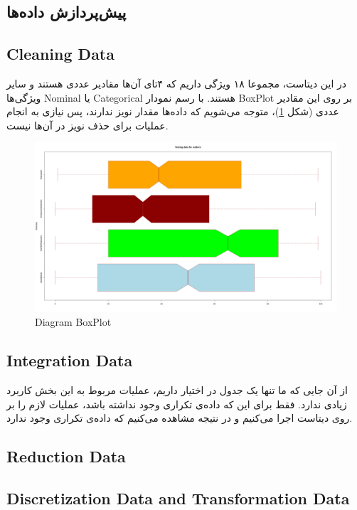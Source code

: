 \documentclass{article}
\begin{document}
\begin{large}
        \newpage
        \section{پیش‌پردازش داده‌ها}
        \subsection{Cleaning Data}
        
        در این دیتاست، مجموعا ۱۸ ویژگی داریم که ۴تای آن‌ها مقادیر عددی هستند و سایر ویژگی‌ها Nominal یا Categorical هستند.
        با رسم نمودار BoxPlot بر روی این مقادیر عددی (شکل \ref{fig:boxplot})، متوجه می‌شویم که داده‌ها مقدار نویز ندارند، پس نیازی به انجام عملیات برای حذف نویز در آن‌ها نیست.

        \begin{figure}[h]
            \centering
            \includegraphics[width=1\textwidth]{images/boxplot.png}
            \caption{Diagram BoxPlot}
            \label{fig:boxplot}
        \end{figure}

        \subsection{Integration Data}
        از آن جایی که ما تنها یک جدول در اختیار داریم، عملیات مربوط به این بخش کاربرد زیادی ندارد. فقط برای این‌ که داده‌ی تکراری وجود نداشته باشد، عملیات لازم را بر روی دیتاست اجرا می‌کنیم
        و در نتیجه مشاهده می‌کنیم که داده‌ی تکراری وجود ندارد.

        \subsection{Reduction Data}


        \subsection{Discretization Data and Transformation Data}
        
\end{large}

	 
\end{document}

